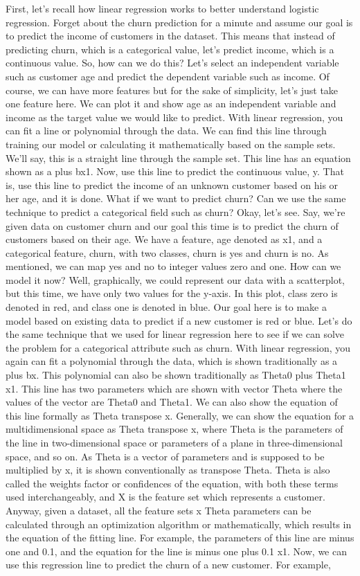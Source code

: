 	First, let's recall how linear regression works to better understand logistic regression. Forget about the churn prediction for a minute and assume our goal is to predict the income of customers in the dataset. This means that instead of predicting churn, which is a categorical value, let's predict income, which is a continuous value. So, how can we do this? Let's select an independent variable such as customer age and predict the dependent variable such as income. Of course, we can have more features but for the sake of simplicity, let's just take one feature here. We can plot it and show age as an independent variable and income as the target value we would like to predict. With linear regression, you can fit a line or polynomial through the data. We can find this line through training our model or calculating it mathematically based on the sample sets. We'll say, this is a straight line through the sample set. This line has an equation shown as a plus bx1. Now, use this line to predict the continuous value, y. That is, use this line to predict the income of an unknown customer based on his or her age, and it is done. What if we want to predict churn? Can we use the same technique to predict a categorical field such as churn? Okay, let's see. Say, we're given data on customer churn and our goal this time is to predict the churn of customers based on their age. We have a feature, age denoted as x1, and a categorical feature, churn, with two classes, churn is yes and churn is no. As mentioned, we can map yes and no to integer values zero and one. How can we model it now? Well, graphically, we could represent our data with a scatterplot, but this time, we have only two values for the y-axis. In this plot, class zero is denoted in red, and class one is denoted in blue. Our goal here is to make a model based on existing data to predict if a new customer is red or blue. Let's do the same technique that we used for linear regression here to see if we can solve the problem for a categorical attribute such as churn. With linear regression, you again can fit a polynomial through the data, which is shown traditionally as a plus bx. This polynomial can also be shown traditionally as Theta0 plus Theta1 x1. This line has two parameters which are shown with vector Theta where the values of the vector are Theta0 and Theta1. We can also show the equation of this line formally as Theta transpose x. Generally, we can show the equation for a multidimensional space as Theta transpose x, where Theta is the parameters of the line in two-dimensional space or parameters of a plane in three-dimensional space, and so on. As Theta is a vector of parameters and is supposed to be multiplied by x, it is shown conventionally as transpose Theta. Theta is also called the weights factor or confidences of the equation, with both these terms used interchangeably, and X is the feature set which represents a customer. Anyway, given a dataset, all the feature sets x Theta parameters can be calculated through an optimization algorithm or mathematically, which results in the equation of the fitting line. For example, the parameters of this line are minus one and 0.1, and the equation for the line is minus one plus 0.1 x1. Now, we can use this regression line to predict the churn of a new customer. For example, 
